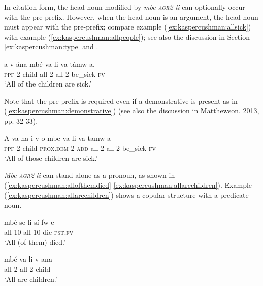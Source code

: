 \documentclass[output=paper,modfonts,nonflat]{langsci/langscibook}
\begin{document}
In citation form, the head noun modified by \textit{mbe-\textsc{agr2}-li} can optionally occur with the pre-prefix.  However, when the head noun is an argument, the head noun must appear with the pre-prefix; compare example (\ref{ex:kaspercushman:allsick}) with example (\ref{ex:kaspercushman:allpeople}); see also the discussion in Section \ref{ex:kaspercushman:type} and \citealt{gambarage16}. 
 
\begin{exe}
\ex 
\gll a-v-ána mbé-va-li va-támw-a. \\
\textsc{ppf}-2-child all-2-all 2-be\_sick-\textsc{fv} \\
\glt `All of the children are sick.' \\ \label{ex:kaspercushman:allsick}
\end{exe}

Note that the pre-prefix is required even if a demonstrative is present as in (\ref{ex:kaspercushman:demonstrative}) (see also the discussion in Matthewson, 2013, pp. 32-33). 
\begin{exe}

\ex \label{ex:kaspercushman:demonstrative}
\gll A-va-na i-v-o mbe-va-li va-tamw-a \\
\textsc{ppf}-2-child \textsc{prox.dem}-2-\textsc{add} all-2-all 2-be\_sick-\textsc{fv} \\
\glt `All of those children are sick.' \\
\end{exe}


\textit{Mbe-\textsc{agr2}-li} can stand alone as a pronoun, as shown in (\ref{ex:kaspercushman:allofthemdied}-\ref{ex:kaspercushman:allarechildren}).  Example (\ref{ex:kaspercushman:allarechildren}) shows a copular structure with a predicate noun. 

\begin{exe}
\ex \label{ex:kaspercushman:allofthemdied} 
\gll mbé-se-li sí-fw-e \\ 
all-10-all 10-die-\textsc{pst}.\textsc{fv} \\
\glt `All (of them) died.' 

\end{exe}

\begin{exe}
\ex \label{ex:kaspercushman:allarechildren} 
\gll mbé-va-li v-ana \\
all-2-all 2-child \\
\glt `All are children.'
\end{exe}
\end{document}
